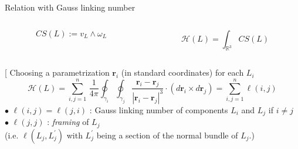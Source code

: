 \documentclass[handout,10pt]{beamer}
\begin{document}
\begin{frame}{Relation with Gauss linking number}\label{frame:msknots2}
		\vspace{-2.5ex}
  	\begin{columns}
		\begin{column}[t]{.5\linewidth}	
			\begin{defblock}
				$$
					CS({L}) :=  v_{L} \wedge  \omega_{ L} 
				$$
			\end{defblock}
		\end{column}
		\begin{column}[t]{.5\linewidth}	
			\begin{defblock}[Helicity]
				$$
 					{\mathcal H}(L) = \int_{\mathbb{R}^3} CS({L})
				$$
			\end{defblock}						
		\end{column}
  	\end{columns}
	\pause
	\begin{propblock}[
		Choosing a parametrization $\mathbf{r}_i$ (in standard coordinates) for each $L_i$ 
		\begin{displaymath}
			{\mathcal H}(L)  = 
			\sum_{i,j=1}^n
			\,\frac{1}{4\pi}
			\oint_{\gamma_i}\oint_{\gamma_j}
			\frac{\mathbf{r}_i - \mathbf{r}_j}{|\mathbf{r}_i - \mathbf{r}_j|^3}
			\cdot (d\mathbf{r}_i \times d\mathbf{r}_j) =
			\sum_{i,j=1}^n \ell(i,j)
		\end{displaymath}
			$\bullet$ $\ell(i,j) = \ell(j,i)$ : Gauss linking number of components $L_i$ and $L_j$ if $i\neq j$\\
			$\bullet$ $\ell(j,j)$ : {\it framing} of $L_j$\\ 
			\phantom{-------}\footnotesize{ (i.e. $\ell(L_j, L_j^{\prime})$ with $L_j^{\prime}$ being a section of the normal bundle of $L_j$.)}\normalsize


\end{propblock}
\end{frame}
\end{document}
